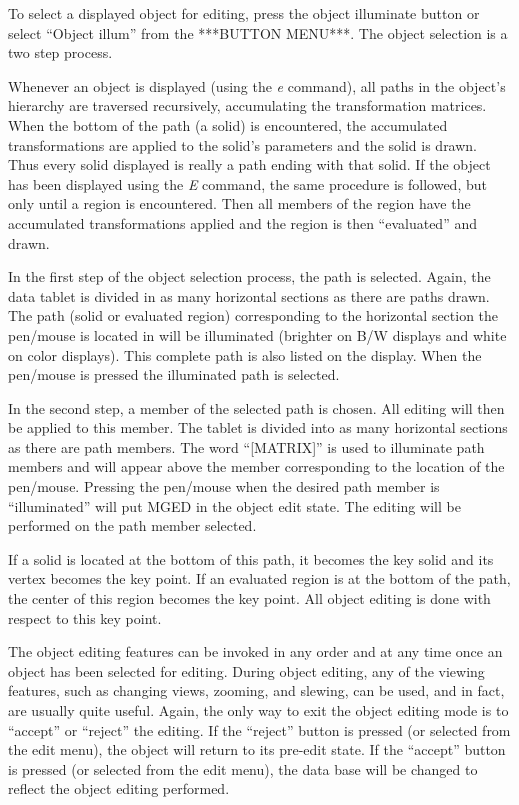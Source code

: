 To select a displayed object for editing, press the object illuminate button
or select ``Object illum'' from the ***BUTTON MENU***.
The object selection is a two step process.

Whenever an object is displayed (using the {\em e} command), all paths in the
object's hierarchy are traversed recursively, accumulating the transformation
matrices.  When the bottom of the path (a solid) is encountered, the
accumulated
transformations are applied to the solid's parameters and the solid is drawn.
Thus every solid displayed is really a path ending with that solid.
If the object has been displayed using the {\em E} command, the same procedure
is followed, but only until a region is encountered.
Then all members of the region have the accumulated transformations
applied and the region is then ``evaluated'' and drawn.

In the first step of the object selection process, the path is selected.
Again, the data tablet is divided in as many horizontal sections as there are
paths drawn.
The path (solid or evaluated region) corresponding to the horizontal
section the pen/mouse is located in will be illuminated (brighter on B/W
displays and white on color displays).
This complete path is also listed on the display.
When the pen/mouse is pressed the illuminated path is selected.

In the second step, a member of the selected path is chosen.
All editing will then be applied to this member.
The tablet is divided into as many horizontal sections as there are
path members.
The word ``[MATRIX]'' is used to illuminate path members and will appear
above the member corresponding to the location of the pen/mouse.
Pressing the pen/mouse when the desired path member is ``illuminated''
will put MGED in the object edit state.
The editing will be performed on the path member selected.

If a solid is located at the bottom of this path, it becomes the key
solid and its vertex becomes the key point.
If an evaluated region is at the bottom of the path, the center of
this region becomes the key point.
All object editing is done with respect to this key point.

The object editing features can be invoked in any order and at any time
once an object has been selected for editing.  During object editing, any of
the viewing features, such as changing views, zooming, and slewing, can be
used, and in fact, are usually quite useful.  Again, the only way to exit the
object editing mode is to ``accept'' or ``reject'' the editing.
If the ``reject'' button is pressed (or selected from the edit menu), the
object will return to its pre-edit state.  If the ``accept'' button is pressed
(or selected from the edit menu), the data base will be changed to reflect the
object editing performed.

